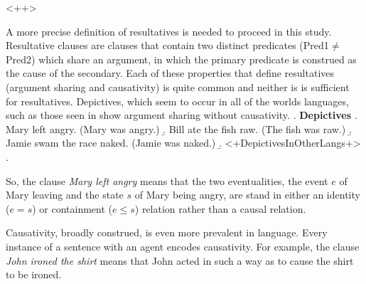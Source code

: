\documentclass[letterpaper]{article}
\begin{document}
<++>

A more precise definition of resultatives is needed to proceed in this study.
Resultative clauses are clauses that contain two distinct predicates (Pred1$\neq$Pred2) which share an argument, in which the primary predicate is construed as the cause of the secondary.
Each of these properties that define resultatives (argument sharing and causativity) is quite common and neither is is sufficient for resultatives.
Depictives, which seem to occur in all of the worlds languages, such as those seen in \Next show argument sharing without causativity.
\ex. \textbf{Depictives}
\a. Mary left angry. (Mary was angry.)
\b. Bill ate the fish raw. (The fish was raw.)
\b. Jamie swam the race naked. (Jamie was naked.)
\b. <+DepictivesInOtherLangs+>
\z.

So, the clause \textit{Mary left angry} means that the two eventualities, the event $e$ of Mary leaving and the state $s$ of Mary being angry, are stand in either an identity ($e=s$) or containment ($e\leq s$) relation rather than a causal relation.

Causativity, broadly construed, is even more prevalent in language.
Every instance of a sentence with an agent encodes causativity.
For example, the clause \textit{John ironed the shirt} means that John acted in such a way as to cause the shirt to be ironed.
\end{document}
